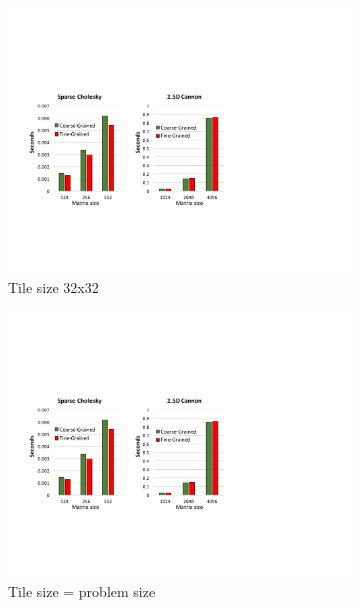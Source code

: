 \begin{figure}[htb]
\centering
\begin{subfigure}{0.29\textwidth}
\includegraphics[width=\textwidth]{figures/choleskyScheResults.pdf}
\caption{Tile size 32x32}
\label{choleskySche}
\end{subfigure}
\begin{subfigure}{0.29\textwidth}
\includegraphics[width=\textwidth]{figures/25DCannonScheResults.pdf}
\caption{Tile size = problem size}
\label{CannonSche}
\end{subfigure}
\begin{subfigure}{0.33\textwidth}

\end{subfigure}
\end{figure}
